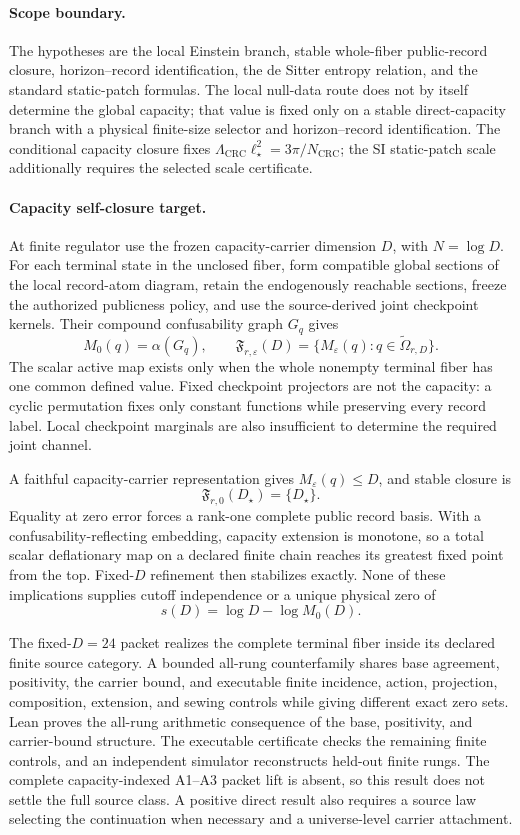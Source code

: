 \paragraph{\textbf{Scope boundary.}}
The hypotheses are the local Einstein branch, stable whole-fiber public-record closure,
horizon--record identification, the de Sitter entropy relation, and the standard static-patch formulas.
The local null-data route does not
by itself determine the global capacity; that value is fixed only on a stable direct-capacity
branch with a physical finite-size selector and horizon--record identification. The conditional capacity
closure fixes \(\Lambda_{\mathrm{CRC}}\ell_\star^2=3\pi/N_{\mathrm{CRC}}\); the SI static-patch
scale additionally requires the selected scale certificate.

\paragraph{\textbf{Capacity self-closure target.}}
At finite regulator use the frozen capacity-carrier dimension \(D\), with
\(N=\log D\). For each terminal state in the unclosed fiber, form compatible
global sections of the local record-atom diagram, retain the endogenously
reachable sections, freeze the authorized publicness policy, and use the
source-derived joint checkpoint kernels. Their compound confusability graph
\(G_q\) gives
\[
M_0(q)=\alpha(G_q),
\qquad
\mathfrak F_{r,\varepsilon}(D)=
\{M_\varepsilon(q):q\in\widetilde\Omega_{r,D}\}.
\]
The scalar active map exists only when the whole nonempty terminal fiber has
one common defined value. Fixed checkpoint projectors are not the capacity: a
cyclic permutation fixes only constant functions while preserving every
record label. Local checkpoint marginals are also insufficient to determine
the required joint channel.

A faithful capacity-carrier representation gives \(M_\varepsilon(q)\le D\), and stable closure is
\[
\mathfrak F_{r,0}(D_\star)=\{D_\star\}.
\]
Equality at zero error forces a rank-one complete public record basis. With a
confusability-reflecting embedding, capacity extension is monotone, so a total
scalar deflationary map on a declared finite chain reaches its greatest fixed
point from the top. Fixed-\(D\) refinement then stabilizes exactly. None of
these implications supplies cutoff independence or a unique physical zero of
\[
s(D)=\log D-\log M_0(D).
\]

The fixed-\(D=24\) packet realizes the complete terminal fiber inside its
declared finite source category.
A bounded all-rung counterfamily shares base agreement, positivity, the
carrier bound, and executable finite incidence, action, projection,
composition, extension, and sewing controls while giving different exact
zero sets. Lean proves the all-rung arithmetic consequence of the base,
positivity, and carrier-bound structure. The executable certificate checks
the remaining finite controls, and an independent simulator reconstructs
held-out finite rungs. The complete capacity-indexed A1--A3 packet lift is
absent, so this result does not settle the full source class.
A positive direct result also requires a source law selecting the continuation
when necessary and a universe-level carrier attachment.

